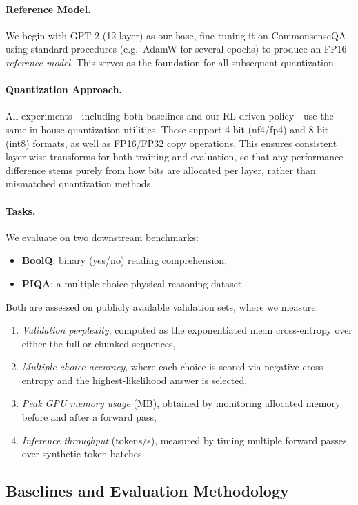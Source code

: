 \documentclass{article}
\begin{document}
	\paragraph{Reference Model.}
	We begin with GPT-2 (12-layer) as our base, fine-tuning it on CommonsenseQA using standard procedures (e.g.\ AdamW for several epochs) to produce an FP16 \emph{reference model}. This serves as the foundation for all subsequent quantization.
	
	\paragraph{Quantization Approach.}
	All experiments---including both baselines and our RL-driven policy---use the same in-house quantization utilities. These support 4-bit (nf4/fp4) and 8-bit (int8) formats, as well as FP16/FP32 copy operations. This ensures consistent layer-wise transforms for both training and evaluation, so that any performance difference stems purely from how bits are allocated per layer, rather than mismatched quantization methods.
	
	\paragraph{Tasks.}
	We evaluate on two downstream benchmarks:
	\begin{itemize}
		\item \textbf{BoolQ}: binary (yes/no) reading comprehension,
		\item \textbf{PIQA}: a multiple-choice physical reasoning dataset.
	\end{itemize}
	Both are assessed on publicly available validation sets, where we measure:
	\begin{enumerate}
		\item \emph{Validation perplexity}, computed as the exponentiated mean cross-entropy over either the full or chunked sequences,
		\item \emph{Multiple-choice accuracy}, where each choice is scored via negative cross-entropy and the highest-likelihood answer is selected,
		\item \emph{Peak GPU memory usage} (MB), obtained by monitoring allocated memory before and after a forward pass,
		\item \emph{Inference throughput} (tokens/s), measured by timing multiple forward passes over synthetic token batches.
	\end{enumerate}
	
	\subsection{Baselines and Evaluation Methodology}
	
\end{document}
